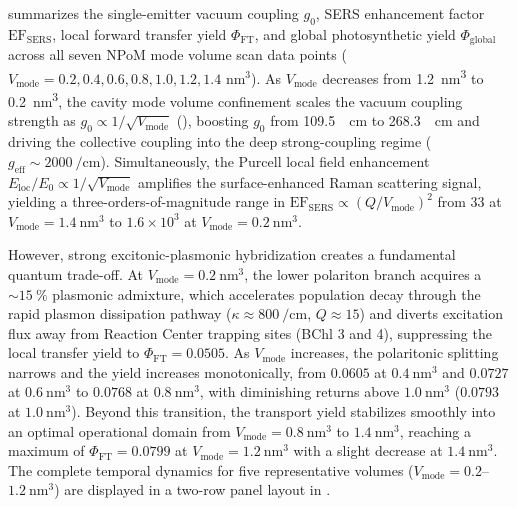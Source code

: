 \documentclass[12pt]{iopart}
\begin{document}
 summarizes the single-emitter vacuum coupling $g_0$, SERS enhancement factor $\mathrm{EF}_{\mathrm{SERS}}$, local forward transfer yield $\Phi_{\mathrm{FT}}$, and global photosynthetic yield $\Phi_{\mathrm{global}}$ across all seven NPoM mode volume scan data points ($V_{\mathrm{mode}} = 0.2, 0.4, 0.6, 0.8, 1.0, 1.2, 1.4\text{ nm}^3$).
As $V_{\mathrm{mode}}$ decreases from \qty{1.2}{\nm\cubed} to \qty{0.2}{\nm\cubed}, the cavity mode volume confinement scales the vacuum coupling strength as $g_0 \propto 1/\sqrt{V_{\mathrm{mode}}}$ (), boosting $g_0$ from \qty{109.5}{\per\cm} to \qty{268.3}{\per\cm} and driving the collective coupling into the deep strong-coupling regime ($g_{\mathrm{eff}} \sim \qty{2000}{\per\cm}$).
Simultaneously, the Purcell local field enhancement $E_{\mathrm{loc}}/E_0 \propto 1/\sqrt{V_{\mathrm{mode}}}$ amplifies the surface-enhanced Raman scattering signal, yielding a three-orders-of-magnitude range in $\mathrm{EF}_{\mathrm{SERS}} \propto (Q/V_{\mathrm{mode}})^2$ from $33$ at $V_{\mathrm{mode}} = \qty{1.4}{\nm\cubed}$ to $1.6 \times 10^3$ at $V_{\mathrm{mode}} = \qty{0.2}{\nm\cubed}$.

However, strong excitonic-plasmonic hybridization creates a fundamental quantum trade-off. At $V_{\mathrm{mode}} = \qty{0.2}{\nm\cubed}$, the lower polariton branch acquires a $\sim \qty{15}{\percent}$ plasmonic admixture, which accelerates population decay through the rapid plasmon dissipation pathway ($\kappa \approx \qty{800}{\per\cm}$, $Q \approx 15$) and diverts excitation flux away from Reaction Center trapping sites (BChl 3 and 4), suppressing the local transfer yield to $\Phi_{\mathrm{FT}} = 0.0505$.
As $V_{\mathrm{mode}}$ increases, the polaritonic splitting narrows and the yield increases monotonically, from $0.0605$ at $\qty{0.4}{\nm\cubed}$ and $0.0727$ at $\qty{0.6}{\nm\cubed}$ to $0.0768$ at $\qty{0.8}{\nm\cubed}$, with diminishing returns above $\qty{1.0}{\nm\cubed}$ ($0.0793$ at $\qty{1.0}{\nm\cubed}$).
Beyond this transition, the transport yield stabilizes smoothly into an optimal operational domain from $V_{\mathrm{mode}} = \qty{0.8}{\nm\cubed}$ to $\qty{1.4}{\nm\cubed}$, reaching a maximum of $\Phi_{\mathrm{FT}} = 0.0799$ at $V_{\mathrm{mode}} = \qty{1.2}{\nm\cubed}$ with a slight decrease at $\qty{1.4}{\nm\cubed}$. The complete temporal dynamics for five representative volumes ($V_{\mathrm{mode}} = 0.2$--$1.2~\mathrm{nm}^3$) are displayed in a two-row panel layout in .
\end{document}
